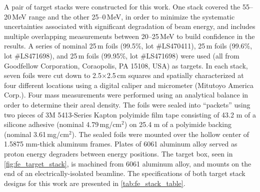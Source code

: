 A pair of target stacks were constructed for this work.
One stack covered the 55--20\,MeV range and the other  25--0\,MeV, in order to minimize the systematic uncertainties associated with significant degradation of beam energy, and
includes multiple overlapping measurements between 20--25\,MeV to build confidence in the results. 
A series of nominal 25\,\mmicro m  foils (99.5\%, lot \#LS470411), 25\,\mmicro m  foils (99.6\%, lot \#LS471698), and 25\,\mmicro m  foils (99.95\%, lot \#LS471698) were used (all from Goodfellow Corporation, Coraopolis, PA 15108, USA) as targets.
In each stack, seven foils 
were cut down to 2.5$\times$2.5\,cm squares and spatially characterized 
at four different locations using a digital caliper and micrometer (Mitutoyo America Corp.).
Four mass measurements were performed using an analytical balance 
in order to determine their areal density. 
The foils were  sealed into \enquote{packets} using two pieces of  3M 5413-Series Kapton polyimide film tape 
consisting of 43.2 \mmicro m of a silicone adhesive (nominal 4.79\,mg/cm$^2$) on 25.4 \mmicro m of a polyimide backing (nominal 3.61\,mg/cm$^2$).
The sealed foils were mounted over the hollow center of  1.5875 mm-thick aluminum frames.
Plates of 6061 aluminum alloy  served as proton energy degraders  between energy positions.
The target box, seen in \autoref{fig:fe_target_stack}, is machined from 6061 aluminum alloy, and mounts on the end of an electrically-isolated beamline.
The specifications of both target stack designs for this work are presented in \autoref{tab:fe_stack_table}.




